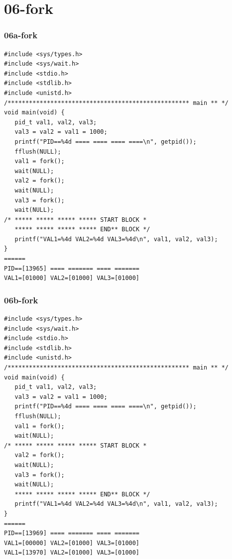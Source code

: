 \documentclass[xcolor=table, notheorems, hyperref={pdfpagelabels=false}]{beamer}
\begin{document}
\section{06-fork}
\begin{frame}[fragile]
\frametitle{06a-fork}
\begin{lstlisting}[basicstyle=\ttfamily\tiny]
#include <sys/types.h>
#include <sys/wait.h>
#include <stdio.h>
#include <stdlib.h>
#include <unistd.h>
/*************************************************** main ** */
void main(void) {
   pid_t val1, val2, val3;
   val3 = val2 = val1 = 1000;
   printf("PID==%4d ==== ==== ==== ====\n", getpid());
   fflush(NULL);
   val1 = fork();
   wait(NULL);
   val2 = fork();
   wait(NULL);
   val3 = fork();
   wait(NULL);
/* ***** ***** ***** ***** START BLOCK *
   ***** ***** ***** ***** END** BLOCK */
   printf("VAL1=%4d VAL2=%4d VAL3=%4d\n", val1, val2, val3);
}
======
PID==[13965] ==== ======= ==== =======
VAL1=[01000] VAL2=[01000] VAL3=[01000]
\end{lstlisting}
\end{frame}

\begin{frame}[fragile]
\frametitle{06b-fork}
\begin{lstlisting}[basicstyle=\ttfamily\tiny]
#include <sys/types.h>
#include <sys/wait.h>
#include <stdio.h>
#include <stdlib.h>
#include <unistd.h>
/*************************************************** main ** */
void main(void) {
   pid_t val1, val2, val3;
   val3 = val2 = val1 = 1000;
   printf("PID==%4d ==== ==== ==== ====\n", getpid());
   fflush(NULL);
   val1 = fork();
   wait(NULL);
/* ***** ***** ***** ***** START BLOCK *
   val2 = fork();
   wait(NULL);
   val3 = fork();
   wait(NULL);
   ***** ***** ***** ***** END** BLOCK */
   printf("VAL1=%4d VAL2=%4d VAL3=%4d\n", val1, val2, val3);
}
======
PID==[13969] ==== ======= ==== =======
VAL1=[00000] VAL2=[01000] VAL3=[01000]
VAL1=[13970] VAL2=[01000] VAL3=[01000]

\end{lstlisting}
\end{frame}
\end{document}
